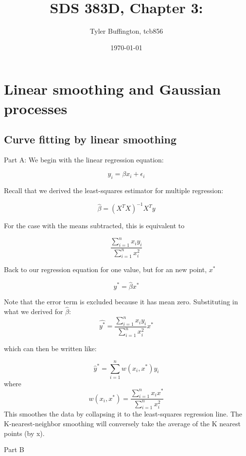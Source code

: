 \documentclass[12pt]{article}%
\begin{document}
      \title{SDS 383D, Chapter 3: }
      \author{Tyler Buffington, tcb856}
      \date{\today}
      \maketitle

	\section{Linear smoothing and Gaussian processes}
		\subsection*{Curve fitting by linear smoothing}
			Part A:
			We begin with the linear regression equation:
			   
			$$y_i = \beta x_i + \epsilon_i$$
			   
			Recall that we derived the least-squares estimator for multiple regression:

			$$\hat{\beta} = (X^TX)^{-1}X^Ty$$

			For the case with the means subtracted, this is equivalent to 
				
			$$\frac{\sum_{i=1}^{n}x_iy_i}{\sum_{i=1}^{n}x_i^2}$$

			Back to our regression equation for one value, but for an new point, $x^*$

			$$\hat{y}^* = \hat{\beta}x^*$$

			Note that the error term is excluded because it has mean zero. Substituting in         what we derived for $\hat{\beta}$:
			$$\hat{y^*} =\frac{\sum_{i=1}^{n}x_iy_i}{\sum_{i=1}^{n}x_i^2}x^*$$

			which can then be written like:

			$$\hat{y}^* = \sum_{i=1}^{n}w(x_i,x^*)y_i$$
			where
			$$w(x_i,x^*)= \frac{\sum_{i=1}^{n}x_ix^*}{\sum_{i=1}^{n}x_i^2}$$
			This smoothes the data by collapsing it to the least-squares regression line. The K-nearest-neighbor smoothing will conversely take the average of the K nearest points (by x).


			Part B	
\end{document}
